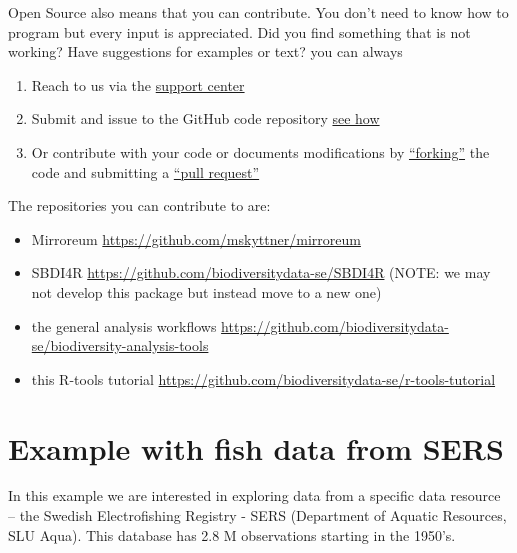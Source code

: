 \documentclass[
  10pt,
]{article}
\providecommand{\tightlist}{%
  \setlength{\itemsep}{0pt}\setlength{\parskip}{0pt}}
\begin{document}
Open Source also means that you can contribute. You don't need to know how to program but every input is appreciated. Did you find something that is not working? Have suggestions for examples or text? you can always

\begin{enumerate}
\def\labelenumi{\arabic{enumi}.}
\tightlist
\item
  Reach to us via the \href{https://docs.biodiversitydata.se/support/}{support center}
\item
  Submit and issue to the GitHub code repository \href{https://docs.github.com/en/github/managing-your-work-on-github/managing-your-work-with-issues-and-pull-requests/creating-an-issue}{see how}
\item
  Or contribute with your code or documents modifications by \href{https://docs.github.com/en/github/getting-started-with-github/quickstart/fork-a-repo}{``forking''} the code and submitting a \href{https://docs.github.com/en/github/collaborating-with-issues-and-pull-requests/proposing-changes-to-your-work-with-pull-requests/creating-a-pull-request-from-a-fork}{``pull request''}
\end{enumerate}

The repositories you can contribute to are:

\begin{itemize}
\tightlist
\item
  Mirroreum \url{https://github.com/mskyttner/mirroreum}\\
\item
  SBDI4R \url{https://github.com/biodiversitydata-se/SBDI4R} (NOTE: we may not develop this package but instead move to a new one)\\
\item
  the general analysis workflows \url{https://github.com/biodiversitydata-se/biodiversity-analysis-tools}\\
\item
  this R-tools tutorial \url{https://github.com/biodiversitydata-se/r-tools-tutorial}
\end{itemize}

\hypertarget{example-with-fish-data-from-sers}{%
\section{Example with fish data from SERS}\label{example-with-fish-data-from-sers}}

In this example we are interested in exploring data from a specific data resource -- the Swedish Electrofishing Registry - SERS (Department of Aquatic Resources, SLU Aqua). This database has 2.8 M observations starting in the 1950's.
\end{document}
